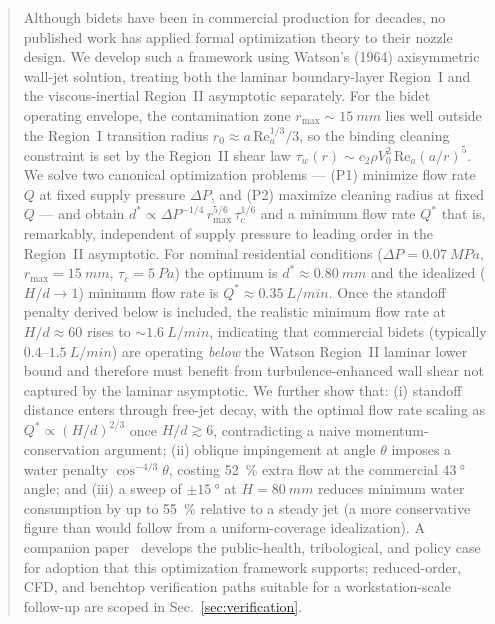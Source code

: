 \documentclass[aps,prfluids,reprint,amsmath,amssymb,floatfix]{revtex4-2}
\newcommand{\Rey}{\mathrm{Re}}
\begin{document}
\begin{abstract}
Although bidets have been in commercial production for decades, no published
work has applied formal optimization theory to their nozzle design. We
develop such a framework using Watson's (1964) axisymmetric wall-jet solution,
treating both the laminar boundary-layer Region~I and the viscous-inertial
Region~II asymptotic separately. For the bidet operating envelope, the
contamination zone $r_\mathrm{max} \sim \SI{15}{mm}$ lies well outside
the Region~I transition radius $r_0 \approx a\,\Rey_a^{1/3}/3$, so the
binding cleaning constraint is set by the Region~II shear law
$\tau_w(r) \sim c_2 \rho V_0^2\,\Rey_a (a/r)^5$. We solve two canonical
optimization problems --- (P1) minimize flow rate $Q$ at fixed supply
pressure $\Delta P$, and (P2) maximize cleaning radius at fixed $Q$ ---
and obtain $d^* \propto \Delta P^{-1/4}\,r_\mathrm{max}^{5/6}\,\tau_c^{1/6}$
and a minimum flow rate $Q^*$ that is, remarkably, independent of supply
pressure to leading order in the Region~II asymptotic. For nominal
residential conditions ($\Delta P = \SI{0.07}{MPa}$, $r_\mathrm{max} = \SI{15}{mm}$,
$\tau_c = \SI{5}{Pa}$) the optimum is
$d^* \approx \SI{0.80}{mm}$ and the idealized
($H/d \to 1$) minimum flow rate is $Q^* \approx \SI{0.35}{L/min}$. Once
the standoff penalty derived below is included, the realistic minimum
flow rate at $H/d \approx 60$ rises to $\sim \SI{1.6}{L/min}$, indicating
that commercial bidets (typically $0.4$--$\SI{1.5}{L/min}$) are operating
\emph{below} the Watson Region~II laminar lower bound and therefore must
benefit from turbulence-enhanced wall shear not captured by the laminar
asymptotic. We further show that: (i) standoff
distance enters through free-jet decay, with the optimal flow rate
scaling as $Q^* \propto (H/d)^{2/3}$ once $H/d \gtrsim 6$, contradicting
a naive momentum-conservation argument; (ii) oblique impingement at
angle $\theta$ imposes a water penalty $\cos^{-4/3}\theta$, costing
\SI{52}{\percent} extra flow at the commercial $\SI{43}{\degree}$ angle;
and (iii) a sweep of $\pm\SI{15}{\degree}$ at $H = \SI{80}{mm}$
reduces minimum water consumption by up to \SI{55}{\percent} relative
to a steady jet (a more conservative figure than would follow from a
uniform-coverage idealization). A companion paper~\citep{BurtonCasePaper}
develops the public-health, tribological, and policy case for adoption
that this optimization framework supports; reduced-order, CFD, and
benchtop verification paths suitable for a workstation-scale
follow-up are scoped in Sec.~\ref{sec:verification}.
\end{abstract}
\end{document}
